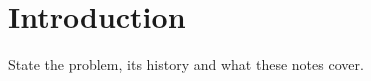 \section{Introduction}\label{sec:intro}

State the problem, its history and what these notes cover.
